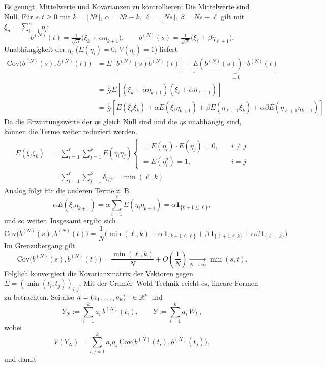 \begin{satz}
Es genügt, Mittelwerte und Kovarianzen zu kontrollieren:
Die Mittelwerte sind Null. Für $s,t\ge0$ mit $k=\lfloor Nt\rfloor$, $\alpha=Nt-k$, 
$\ell=\lfloor Ns\rfloor$, $\beta=Ns-\ell$ gilt mit $\xi_n=\sum_{i=1}^n\eta_i$:
$$
b^{(N)}(t)=\tfrac1{\sqrt N}\big(\xi_k+\alpha\eta_{k+1}\big),\qquad
b^{(N)}(s)=\tfrac1{\sqrt N}\big(\xi_\ell+\beta\eta_{\ell+1}\big).
$$
Unabhängigkeit der $\eta_i$ ($E(\eta_i)=0$, $V(\eta_i)=1$) liefert
$$
\begin{aligned}
\mathrm{Cov}\!\big(b^{(N)}(s),b^{(N)}(t)\big) &= E \left [ b^{(N)}(s) b^{(N)}(t) \right ] - \underbrace{E(b^{(N)}(s)) \cdot b^{(N)}(t)}_{=0}
\\ &= \frac{1}{N} E \left [ (\xi_k + \alpha \eta_{k+1}) (\xi_\ell + \alpha \eta_{\ell+1}) \right ] 
\\ &= \frac{1}{N} \left [ E(\xi_\ell \xi_k) + \alpha E(\xi_\ell \eta_{k+1}) + \beta E(\eta_{\ell + 1} \xi_k) + \alpha \beta E(\eta_{\ell + 1} \eta_{k+1}) \right ]
\end{aligned}
$$
Da die Erwartungswerte der $\eta$s gleich Null sind und die $\eta$s unabhängig sind, können die Terme weiter reduziert werden.
$$
\begin{aligned}
E(\xi_\ell \xi_k) &= \sum_{i=1}^\ell \sum_{j=1}^k E(\eta_i \eta_j) \begin{cases} = E(\eta_i)\cdot E(\eta_j) = 0, \quad &i \neq j \\ = E(\eta_i^2) = 1, \quad &i = j \end{cases}
\\ &= \sum_{i=1}^\ell \sum_{j=1}^k \delta_{i, j} = \min(\ell, k)
\end{aligned}
$$
Analog folgt für die anderen Terme z. B.
$$\alpha E(\xi_\ell \eta_{k+1}) = \alpha \sum_{i=1}^\ell E(\eta_i \eta_{k+1}) = \alpha \mathbf 1_{\{k+1\le \ell\}},$$
und so weiter. Insgesamt ergibt sich
$$
\mathrm{Cov}\!\big(b^{(N)}(s),b^{(N)}(t)\big) = \frac1N\Big(\min(\ell,k)+\alpha\,\mathbf 1_{\{k+1\le \ell\}}+\beta\,\mathbf 1_{\{\ell+1\le k\}}+\alpha\beta\,\mathbf 1_{\{\ell=k\}}\Big)
$$
Im Grenzübergang gilt
$$
\mathrm{Cov}\!\big(b^{(N)}(s),b^{(N)}(t)\big)
=\frac{\min(\ell,k)}{N}+O\!\left(\frac1N\right)\xrightarrow[N\to\infty]{}\min(s,t).
$$
Folglich konvergiert die Kovarianzmatrix der Vektoren gegen 
$\Sigma=(\min(t_i,t_j))_{i,j}$.
Mit der Cramér–Wold-Technik reicht es, lineare Formen zu betrachten. Sei also $a=(a_1,\dots,a_k)^\top\in\Bbb R^k$ und
$$
Y_N:=\sum_{i=1}^k a_i\,b^{(N)}(t_i),\qquad
Y:=\sum_{i=1}^k a_i\,W_{t_i},
$$
wobei
$$
V(Y_N)=\sum_{i,j=1}^k a_i a_j\,\mathrm{Cov}\!\big(b^{(N)}(t_i),b^{(N)}(t_j)\big),
$$
und damit

\end{satz}
